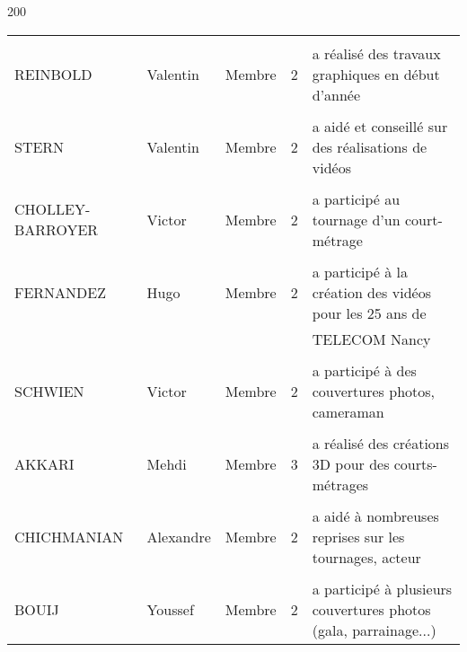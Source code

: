 \begin{textblock}{200}
\begin{table}
\begin{tabular}{|l|l|l|c|l|}
			& & & & \\
			REINBOLD 	& Valentin 	& Membre 		& 2 	& a réalisé des travaux graphiques en début d'année\\
			& & & & \\
			STERN 		& Valentin 	& Membre 		& 2 	& a aidé et conseillé sur des réalisations de vidéos\\
			& & & & \\
			CHOLLEY-BARROYER & Victor & Membre 		& 2		& a participé au tournage d'un court-métrage\\
			& & & & \\
			FERNANDEZ 	& Hugo 		& Membre 		& 2 	& a participé à la création des vidéos pour les 25 ans de \\ & & & & TELECOM Nancy \\
			& & & & \\
			SCHWIEN 	& Victor 	& Membre 		& 2 	&a participé à des couvertures photos, cameraman\\
			& & & & \\
			AKKARI 		& Mehdi 	& Membre 		& 3			& a réalisé des créations 3D pour des courts-métrages\\
			& & & & \\
			CHICHMANIAN & Alexandre & Membre 		& 2 		& a aidé à nombreuses reprises sur les tournages, acteur\\
			& & & & \\
			BOUIJ 		& Youssef 	& Membre 		& 2 		& a participé à plusieurs couvertures photos (gala, parrainage...)\\
			\hline
	\end{tabular}
\end{table}
\end{textblock}